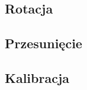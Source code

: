 	
	
	
	\subsection{Rotacja}
	\label{subsec:rotacja}
	
	
	
	\subsection{Przesunięcie}
	\label{subsec:przesuniecie}	
	
	
	
	\subsection{Kalibracja}
	\label{subsec:kalibracja}
	
	

